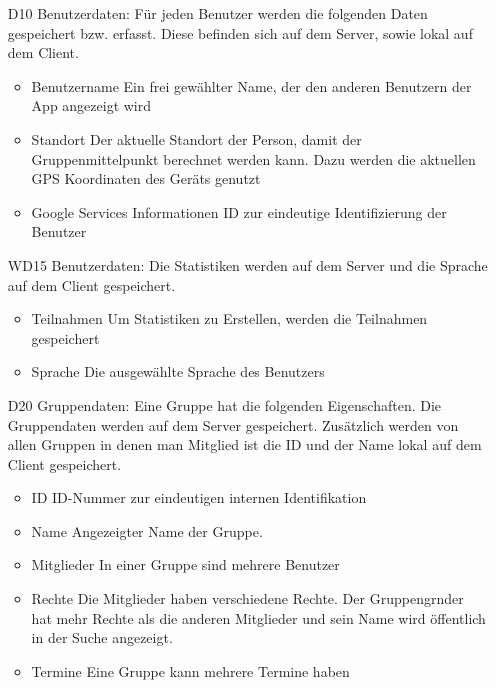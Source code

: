 \documentclass{scrartcl}
\begin{document}
	\begin{itemize}
		\item [D10] Benutzerdaten:
		\newline Für jeden Benutzer werden die folgenden Daten gespeichert bzw. erfasst. Diese befinden sich auf dem \gls{Server}, sowie lokal auf dem \gls{Client}.
		\begin{itemize}
			\item Benutzername
			\newline Ein frei gewählter Name, der den anderen Benutzern der App angezeigt wird
			\item Standort
			\newline Der aktuelle Standort der Person, damit der Gruppenmittelpunkt berechnet werden kann. Dazu werden die aktuellen GPS Koordinaten des Geräts genutzt
			\item \gls{Google Services} Informationen
			\newline ID zur eindeutige Identifizierung der Benutzer
		\end{itemize}
		
		\item [WD15] Benutzerdaten:
\newline Die Statistiken werden auf dem \gls{Server} und die Sprache auf dem \gls{Client} gespeichert.
		\begin{itemize}
			\item Teilnahmen
			\newline Um Statistiken zu Erstellen, werden die Teilnahmen gespeichert
			\item Sprache
			\newline Die ausgewählte Sprache des Benutzers
			
		\end{itemize}
		
		
		\item [D20] Gruppendaten:
		\newline Eine Gruppe hat die folgenden Eigenschaften.
		Die Gruppendaten werden auf dem \gls{Server} gespeichert. Zusätzlich werden von allen Gruppen in denen man Mitglied ist die ID und der Name lokal auf dem \gls{Client} gespeichert.
		\begin{itemize}
			\item ID
			\newline ID-Nummer zur eindeutigen internen Identifikation
			\item Name
			\newline Angezeigter Name der Gruppe.
			\item Mitglieder
			\newline In einer Gruppe sind mehrere Benutzer
			\item Rechte
			\newline Die Mitglieder haben verschiedene Rechte. Der \gls{Gruppengrnder} hat mehr Rechte als die anderen Mitglieder und sein Name wird öffentlich in der Suche angezeigt.
			\item Termine
			\newline Eine Gruppe kann mehrere Termine haben
		\end{itemize}
		

\end{itemize}
\end{document}
